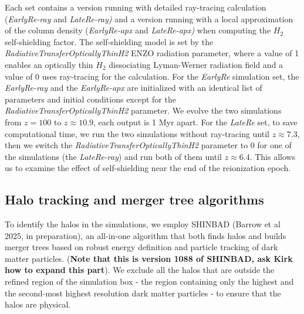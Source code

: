 \documentclass[linenumbers, twocolumn]{aastex631}
\begin{document}
Each set contains a version running with detailed ray-tracing calculation (\textit{EarlyRe-ray} and \textit{LateRe-ray)} and a version running with a local approximation of the column density (\textit{EarlyRe-apx} and \textit{LateRe-apx)} when computing the $H_{2}$ self-shielding factor. The self-shielding model is set by the \textit{RadiativeTransferOpticallyThinH2} ENZO radiation parameter, where a value of 1 enables an optically thin $H_{2}$ dissociating Lyman-Werner radiation field and a value of 0 uses ray-tracing for the calculation. For the \textit{EarlyRe} simulation set, the \textit{EarlyRe-ray} and the \textit{EarlyRe-apx} are initialized with an identical list of parameters and initial conditions except for the \textit{RadiativeTransferOpticallyThinH2} parameter. We evolve the two simulations from $z = 100$ to $z \approx 10.9$, each output is 1 Myr apart. For the \textit{LateRe} set, to save computational time, we run the two simulations without ray-tracing until $z \approx 7.3$, then we switch the \textit{RadiativeTransferOpticallyThinH2} parameter to 0 for one of the simulations (the \textit{LateRe-ray}) and run both of them until $z \approx 6.4$. This allows us to examine the effect of self-shielding near the end of the reionization epoch. 

\subsection{Halo tracking and merger tree algorithms} \label{sec:halotracking}

To identify the halos in the simulations, we employ SHINBAD (Barrow et al 2025, in preparation), an all-in-one algorithm that both finds halos and builds merger trees based on robust energy definition and particle tracking of dark matter particles. (\textbf{Note that this is version 1088 of SHINBAD, ask Kirk how to expand this part}). We exclude all the halos that are outside the refined region of the simulation box - the region containing only the highest and the second-most highest resolution dark matter particles - to ensure that the halos are physical.


\end{document}
